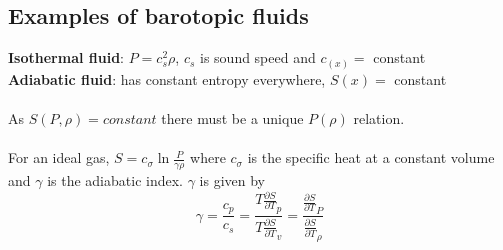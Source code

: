 \documentclass{article}
\begin{document}
\subsection{Examples of barotopic fluids}
\textbf{Isothermal fluid}: $P= c_s^2\rho$, $c_s$ is sound speed and $c_(x)=$ constant\\
\textbf{Adiabatic fluid}: has constant entropy everywhere, $S(x) =$ constant\\\\
As $S(P,\rho) = constant$ there must be a unique $P(\rho)$ relation.\\\\
For an ideal gas, $S = c_{\sigma} \ln \frac{P}{\gamma \rho}$ where $c_{\sigma}$ is the specific heat at a constant volume and $\gamma$ is the adiabatic index. $\gamma$ is given by 
$$
\gamma = \frac{c_p}{c_s} = \frac{T\frac{\partial S}{\partial T}_p}{T \frac{\partial S}{\partial T}_v} = \frac{\frac{\partial S}{\partial T}_P}{\frac{\partial S}{\partial T}_{\rho}}
$$
\end{document}
